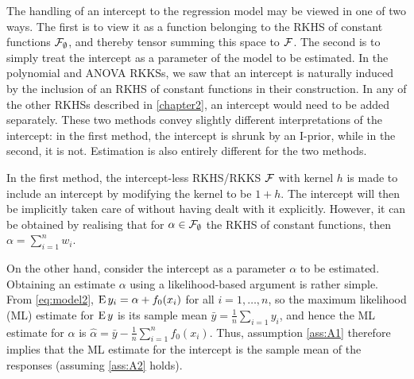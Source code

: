 The handling of an intercept to the regression model may be viewed in one of two ways.
The first is to view it as a function belonging to the RKHS of constant functions ${\mathcal F}_\emptyset$, and thereby tensor summing this space to ${\mathcal F}$.
The second is to simply treat the intercept as a parameter of the model to be estimated.
In the polynomial and ANOVA RKKSs, we saw that an intercept is naturally induced by the inclusion of an RKHS of constant functions in their construction.
In any of the other RKHSs described in \cref{chapter2}, an intercept would need to be added separately.
These two methods convey slightly different interpretations of the intercept: in the first method, the intercept is shrunk by an I-prior, while in the second, it is not.
Estimation is also entirely different for the two methods.

In the first method, the intercept-less RKHS/RKKS ${\mathcal F}$ with kernel $h$ is made to include an intercept by modifying the kernel to be $1 + h$.
The intercept will then be implicitly taken care of without having dealt with it explicitly.
However, it can be obtained by realising that for $\alpha\in{\mathcal F}_\emptyset$ the RKHS of constant functions, then $\alpha = \sum_{i=1}^n w_i$.

On the other hand, consider the intercept as a parameter $\alpha$ to be estimated.
Obtaining an estimate $\alpha$ using a likelihood-based argument is rather simple.
From \cref{eq:model2}, $\operatorname{E} y_i = \alpha + f_0(x_i)$ for all $i=1,\dots,n$, so the maximum likelihood (ML) estimate for $\operatorname{E} y$ is its sample mean $\bar y = \frac{1}{n}\sum_{i=1} y_i$, and hence the ML estimate for $\alpha$ is $\hat\alpha = \bar y - \frac{1}{n} \sum_{i=1}^n f_0(x_i)$.
Thus, assumption \ref{ass:A1} therefore implies that the ML estimate for the intercept is the sample mean of the responses (assuming \ref{ass:A2} holds).


